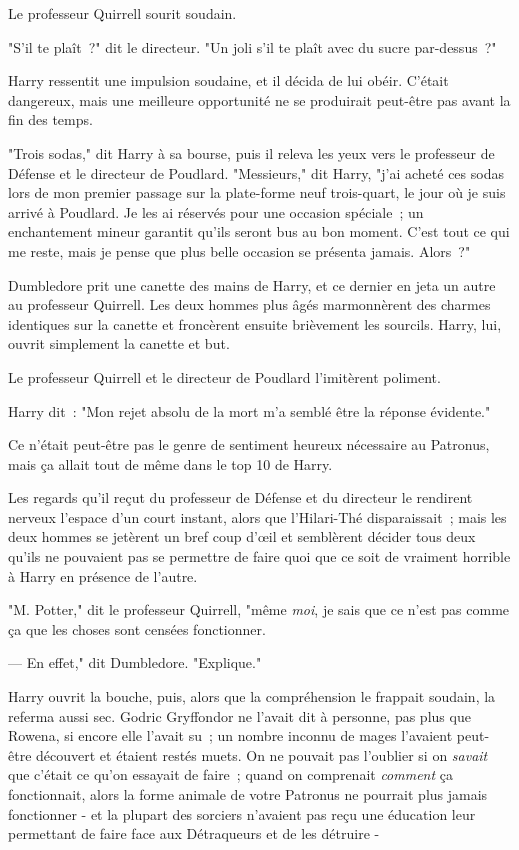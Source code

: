 Le professeur Quirrell sourit soudain.

"S'il te plaît~?" dit le directeur. "Un joli s'il te plaît avec du sucre par-dessus~?"

Harry ressentit une impulsion soudaine, et il décida de lui obéir. C'était dangereux, mais une meilleure opportunité ne se produirait peut-être pas avant la fin des temps.

"Trois sodas," dit Harry à sa bourse, puis il releva les yeux vers le professeur de Défense et le directeur de Poudlard. "Messieurs," dit Harry, "j'ai acheté ces sodas lors de mon premier passage sur la plate-forme neuf trois-quart, le jour où je suis arrivé à Poudlard. Je les ai réservés pour une occasion spéciale~; un enchantement mineur garantit qu'ils seront bus au bon moment. C'est tout ce qui me reste, mais je pense que plus belle occasion se présenta jamais. Alors~?"

Dumbledore prit une canette des mains de Harry, et ce dernier en jeta un autre au professeur Quirrell. Les deux hommes plus âgés marmonnèrent des charmes identiques sur la canette et froncèrent ensuite brièvement les sourcils. Harry, lui, ouvrit simplement la canette et but.

Le professeur Quirrell et le directeur de Poudlard l'imitèrent poliment.

Harry dit~: "Mon rejet absolu de la mort m'a semblé être la réponse évidente."

Ce n'était peut-être pas le genre de sentiment heureux nécessaire au Patronus, mais ça allait tout de même dans le top 10 de Harry.

Les regards qu'il reçut du professeur de Défense et du directeur le rendirent nerveux l'espace d'un court instant, alors que l'Hilari-Thé disparaissait~; mais les deux hommes se jetèrent un bref coup d'œil et semblèrent décider tous deux qu'ils ne pouvaient pas se permettre de faire quoi que ce soit de vraiment horrible à Harry en présence de l'autre.

"M. Potter," dit le professeur Quirrell, "même \emph{moi}, je sais que ce n'est pas comme ça que les choses sont censées fonctionner.

--- En effet," dit Dumbledore. "Explique."

Harry ouvrit la bouche, puis, alors que la compréhension le frappait soudain, la referma aussi sec. Godric Gryffondor ne l'avait dit à personne, pas plus que Rowena, si encore elle l'avait su~; un nombre inconnu de mages l'avaient peut-être découvert et étaient restés muets. On ne pouvait pas l'oublier si on \emph{savait} que c'était ce qu'on essayait de faire~; quand on comprenait \emph{comment} ça fonctionnait, alors la forme animale de votre Patronus ne pourrait plus jamais fonctionner - et la plupart des sorciers n'avaient pas reçu une éducation leur permettant de faire face aux Détraqueurs et de les détruire -

